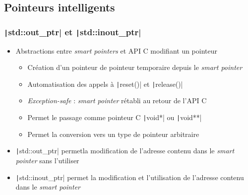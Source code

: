 \documentclass[C++.tex]{subfiles}
\begin{document}
\subsection*{Pointeurs intelligents}
\begin{frame}[fragile]
	\frametitle{\texttt|std::out_ptr| et \texttt|std::inout_ptr|}
	\begin{itemize}
		\item Abstractions entre \textit{smart pointers} et API C modifiant un pointeur


		\begin{itemize}
			\item Création d'un pointeur de pointeur temporaire depuis le \textit{smart pointer}
			\item Automatisation des appels à \texttt|reset()| et \texttt|release()|
			\item \textit{Exception-safe} : \textit{smart pointer} rétabli au retour de l'API C	


			\item Permet le passage comme pointeur C \texttt|void*| ou \texttt|void**|
			\item Permet la conversion vers un type de pointeur arbitraire
		\end{itemize}
		\item \texttt|std::out_ptr| permetla modification de l'adresse contenu dans le \textit{smart pointer} sans l'utiliser
		\item \texttt|std::inout_ptr| permet la modification et l'utilisation de l'adresse contenu dans le \textit{smart pointer}
	\end{itemize}

\end{frame}
\end{document}
